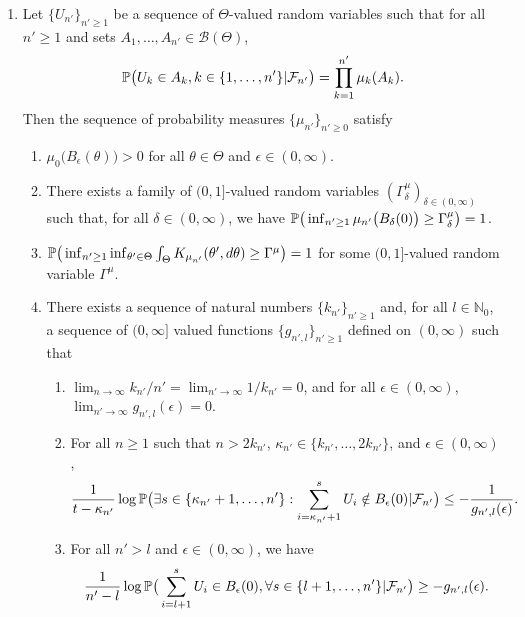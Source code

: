 \begin{enumerate}
    \item Let $\{U_{n'}\}_{n' \geq 1}$ be a sequence of $\Theta$-valued random variables such that for all $n' \geq 1$ and sets $A_1, \ldots, A_{n'} \in \mathcal{B}(\Theta)$, 
    $$
    \mathbb{P}\big(U_k \in A_k, k\in \{1, \ldots, n'\} | \mathcal{F}_{n'}\big) = \prod_{k = 1}^{n'} \mu_k(A_k). 
    $$
    Then the sequence of probability measures $\{\mu_{n'}\}_{n' \geq 0}$ satisfy \label{assumption:kernel}
    \begin{enumerate}
      \item $\mu_0\big(B_{\epsilon}(\theta)\big) > 0$ for all $\theta \in \Theta$ and $\epsilon \in (0, \infty)$. 
      \item There exists a family of $(0, 1]$-valued random variables $(\Gamma^\mu_\delta)_{\delta \in (0, \infty)}$ such that, for all $\delta \in (0, \infty)$, we have $\mathbb{P}\big(\inf_{n' \geq 1}\mu_{n'}\big(B_\delta(0)\big) \geq \Gamma_{\delta}^\mu\big) = 1$.
      \item $\mathbb{P}\big(\inf_{n' \geq 1}\inf_{\theta' \in \Theta}\int_\Theta K_{\mu_{n'}}(\theta', d\theta) \geq \Gamma^\mu\big) = 1$ for some $(0, 1]$-valued random variable $\Gamma^\mu$.
      \item There exists a sequence of natural numbers $\{k_{n'}\}_{n' \geq 1}$ and, for all $l \in \mathbb{N}_0$, a sequence of $(0, \infty]$ valued functions $\{g_{n', l}\}_{n' \geq 1}$ defined on $(0, \infty)$ such that \begin{enumerate} 
  \item $\lim_{n \rightarrow \infty} k_{n'} / {n'} = \lim_{n' \rightarrow \infty} 1/k_{n'} = 0$, and for all $\epsilon \in (0, \infty)$, $\lim_{n' \rightarrow \infty}g_{n', l}(\epsilon) = 0$. 
  \item For all $n \geq 1$ such that $n > 2k_{n'}$, $\kappa_{n'} \in \{k_{n'}, \ldots, 2k_{n'}\}$, and $\epsilon \in (0, \infty)$,
  $$
  \frac{1}{t - \kappa_{n'}}\log \mathbb{P} \big(\exists s \in \{\kappa_{n'} + 1, \ldots, n'\}: \sum_{i = \kappa_{n'} + 1}^s U_i \notin B_{\epsilon}(0) | \mathcal{F}_{n'}\big) \leq -\frac{1}{g_{n', l}(\epsilon)}.
  $$
  \item For all $n' > l$ and $\epsilon \in (0, \infty)$, we have 
  $$
  \frac{1}{n'-l}\log \mathbb{P} \big(\sum_{i = l + 1}^{s} U_i \in B_{\epsilon}(0), \forall s \in \{l + 1, \ldots, n'\}|\mathcal{F}_{n'}\big) \geq -g_{n', l}(\epsilon).
  $$
\end{enumerate}    
  
    \end{enumerate}
  \end{enumerate}
